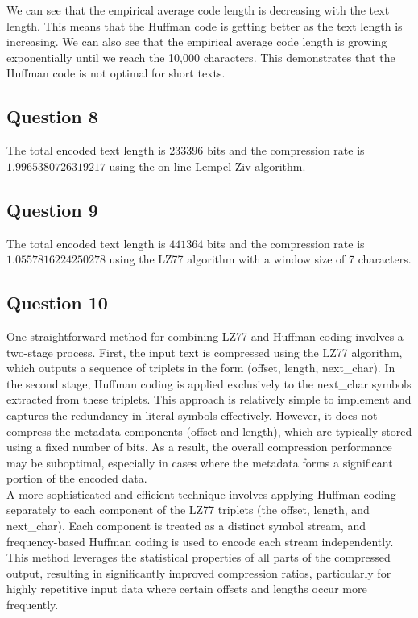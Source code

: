 \documentclass[]{template}
\begin{document}
    \noindent
    We can see that the empirical average code length is decreasing with the text length.
    This means that the Huffman code is getting better as the text length is increasing.
    We can also see that the empirical average code length is growing exponentially until we reach the 10,000 characters.
    This demonstrates that the Huffman code is not optimal for short texts.

    \subsection{Question 8}

    The total encoded text length is $233396$ bits and the compression rate is $1.9965380726319217$ using the
    on-line Lempel-Ziv algorithm.

    \subsection{Question 9}

    The total encoded text length is $441364$ bits and the compression rate is $1.0557816224250278$ using the
    LZ77 algorithm with a window size of 7 characters.

    \subsection{Question 10}

    One straightforward method for combining LZ77 and Huffman coding involves a two-stage process. 
    First, the input text is compressed using the LZ77 algorithm, which outputs a sequence of triplets 
    in the form (offset, length, next\_char). In the second stage, Huffman coding is applied exclusively 
    to the next\_char symbols extracted from these triplets. 
    This approach is relatively simple to implement and captures the redundancy in literal symbols effectively. 
    However, it does not compress the metadata components (offset and length), which are typically stored 
    using a fixed number of bits. As a result, the overall compression performance may be suboptimal, 
    especially in cases where the metadata forms a significant portion of the encoded data.\\

    \noindent
    A more sophisticated and efficient technique involves applying Huffman coding separately to each component of the LZ77 triplets (the offset, length, and next\_char). 
    Each component is treated as a distinct symbol stream, and frequency-based Huffman coding is used to encode each stream independently. 
    This method leverages the statistical properties of all parts of the compressed output, resulting in significantly improved compression ratios, 
    particularly for highly repetitive input data where certain offsets and lengths occur more frequently.\\
\end{document}

